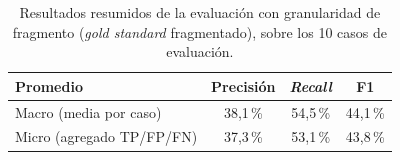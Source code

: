 \begin{table}[htbp]
    \centering
    \caption{Resultados resumidos de la evaluación  con granularidad de fragmento
    (\textit{gold standard} fragmentado), sobre los 10 casos de evaluación.}
    \label{tab:ner_resumen_granular}
    \begin{tabular}{@{}lccc@{}}
    \toprule
    \textbf{Promedio} & \textbf{Precisión} & \textbf{\textit{Recall}} & \textbf{F1} \\
    \midrule
    Macro (media por caso) & 38,1\,\% & 54,5\,\% & 44,1\,\% \\
    Micro (agregado TP/FP/FN) & 37,3\,\% & 53,1\,\% & 43,8\,\% \\
    \bottomrule
    \end{tabular}
\end{table}
